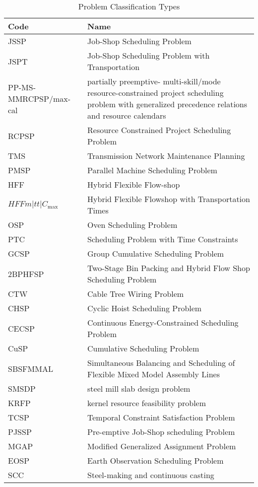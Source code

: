 \documentclass[a4paper]{article}
\begin{document}
\begin{table}[htbp]
\caption{\label{tab:classification}Problem Classification Types}
\begin{tabular}{lp{8cm}}\toprule
Code & Name \\ \midrule
JSSP & Job-Shop Scheduling Problem \\
JSPT & Job-Shop Scheduling Problem with Transportation \\
PP-MS-MMRCPSP/max-cal & partially preemptive- multi-skill/mode resource-constrained project scheduling problem with generalized precedence relations and resource calendars\\
RCPSP & Resource Constrained Project Scheduling Problem \\
TMS & Transmission Network Maintenance Planning \\
PMSP & Parallel Machine Scheduling Problem\\
HFF & Hybrid Flexible Flow-shop \\
$HFFm|tt|C_{\max}$ & Hybrid Flexible Flowshop with Transportation Times\\
OSP & Oven Scheduling Problem \\
PTC & Scheduling Problem with Time Constraints\\
GCSP & Group Cumulative Scheduling Problem \\
2BPHFSP & Two-Stage Bin Packing and Hybrid Flow Shop Scheduling Problem\\
CTW & Cable Tree Wiring Problem\\
CHSP & Cyclic Hoist Scheduling Problem \\
CECSP & Continuous Energy-Constrained Scheduling Problem \\
CuSP & Cumulative Scheduling Problem \\
SBSFMMAL & Simultaneous Balancing and Scheduling of Flexible Mixed Model Assembly Lines\\
SMSDP & steel mill slab design problem \\
KRFP & kernel resource feasibility problem\\
TCSP & Temporal Constraint Satisfaction Problem\\
PJSSP & Pre-emptive Job-Shop scheduling Problem\\
MGAP & Modified Generalized Assignment Problem\\
EOSP & Earth Observation Scheduling Problem \\
SCC & Steel-making and continuous casting \\
\bottomrule
\end{tabular}
\end{table}
\end{document}
